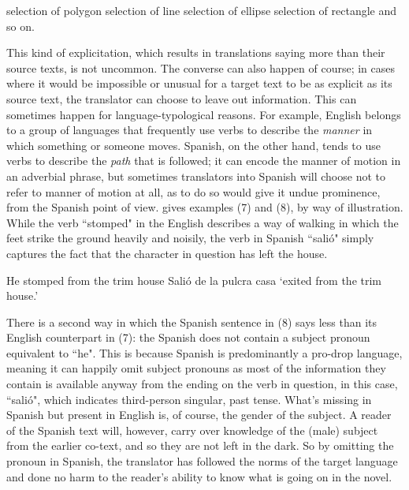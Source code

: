 \documentclass[output=paper]{langscibook}
\begin{document}
\ea selection of polygon
\ex selection of line
\ex selection of ellipse
\ex selection of rectangle
\z
and so on.


This kind of explicitation, which results in translations saying more than their source texts, is not uncommon. The converse can also happen of course; in cases where it would be impossible or unusual for a target text to be as explicit as its source text, the translator can choose to leave out information. This can sometimes happen for  language-typological reasons. For example, English belongs to a group of languages that frequently use verbs to describe the \textit{manner} in which something or someone moves. Spanish, on the other hand, tends to use verbs to describe the \textit{path} that is followed; it can encode the manner of motion in an adverbial phrase, but sometimes translators into Spanish will choose not to refer to manner of motion at all, as to do so would give it undue prominence, from the Spanish point of view.  \citet{Slobin2003} gives examples (7) and (8), by way of illustration. While the verb “stomped" in the English describes a way of walking in which the feet strike the ground heavily and noisily, the verb in Spanish “salió" simply captures the fact that the character in question has left the house.

\ea He stomped from the trim house
\ex Salió de la pulcra casa
\glt `exited from the trim house.'
\z

There is a second way in which the Spanish sentence in (8) says less than its English counterpart in (7): the Spanish does not contain a subject pronoun equivalent to “he". This is because Spanish is predominantly a pro-drop language, meaning it can happily omit subject pronouns as most of the information they contain is available anyway from the ending on the verb in question, in this case, “salió", which indicates third-person singular, past tense. What's missing in Spanish but present in English is, of course, the gender of the subject. A reader of the Spanish text will, however, carry over knowledge of the (male) subject from the earlier co-text, and so they are not left in the dark. So by omitting the pronoun in Spanish, the translator has followed the norms of the target language and done no harm to the reader's ability to know what is going on in the novel.
\end{document}
